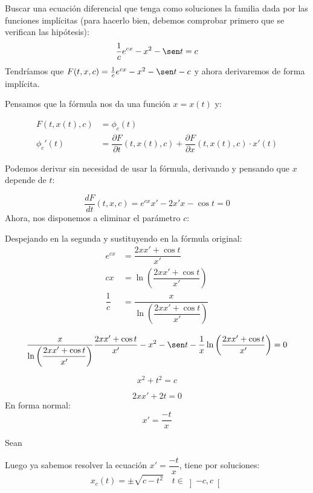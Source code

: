\begin{ejemplo}
    Buscar una ecuación diferencial que tenga como soluciones la familia dada por las funciones implícitas (para hacerlo bien, debemos comprobar primero que se verifican las hipótesis):
    \begin{equation*}
        \dfrac{1}{c}e^{cx} - x^2 - \sen t = c
    \end{equation*}
    Tendríamos que $F(t,x,c) = \frac{1}{c}e^{cx} - x^2-\sen t - c$ y ahora derivaremos de forma implícita.

    Pensamos que la fórmula nos da una función $x=x(t)$ y:

    \begin{align*}
        F(t,x(t),c) &= \phi_c(t) \\
        \phi_c'(t) &= \dfrac{\partial F}{\partial t}(t,x(t),c) + \dfrac{\partial F}{\partial x}(t,x(t),c)\cdot x'(t)
    \end{align*}

    Podemos derivar sin necesidad de usar la fórmula, derivando y pensando que $x$ depende de $t$:

    \begin{equation*}
        \dfrac{d F}{d t}(t,x,c) = e^{cx}x' - 2x'x - \cos t = 0
    \end{equation*}
    Ahora, nos disponemos a eliminar el parámetro $c$:

    Despejando en la segunda y sustituyendo en la fórmula original:
    \begin{align*}
        e^{cx} &= \dfrac{2xx' + \cos t}{x'} \\
        cx &= \ln\left(\dfrac{2xx'+\cos t}{x'}\right) \\
        \dfrac{1}{c} &= \dfrac{x}{\ln \left(\dfrac{2xx' + \cos t}{x'}\right)}
    \end{align*}

    \begin{equation*}
       \dfrac{x}{\ln \left(\dfrac{2xx' + \cos t}{x'}\right)} \dfrac{2xx' + \cos t}{x'} - x^2-\sen t - \dfrac{1}{x}\ln \left(\dfrac{2xx' + \cos t}{x'}\right) = 0
    \end{equation*}
\end{ejemplo}

\begin{ejemplo}
    \begin{equation*}
        x^2+t^2 = c
    \end{equation*}
    
    \begin{equation*}
        2xx' + 2t = 0
    \end{equation*}
    En forma normal:
    \begin{equation*}
        x' = \dfrac{-t}{x}
    \end{equation*}

    Sean
\end{ejemplo}
Luego ya sabemos resolver la ecuación $x' = \dfrac{-t}{x}$, tiene por soluciones:
\begin{equation*}
    x_c(t) = \pm \sqrt{c-t^2} \quad t\in \left]-c,c\right[
\end{equation*}

